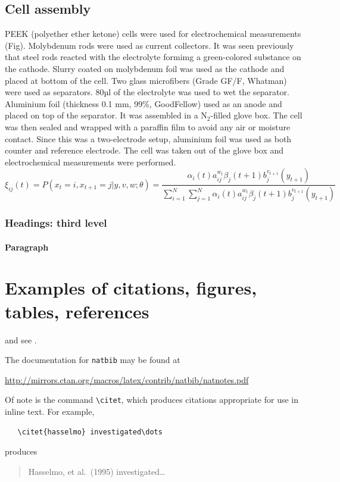 \documentclass{article}
\begin{document}
\subsection{Cell assembly}
PEEK (polyether ether ketone) cells were used for electrochemical measurements (Fig). Molybdenum rods were used as current collectors. It was seen previously that steel rods reacted with the electrolyte formimg a green-colored substance on the cathode. Slurry coated on molybdenum foil was used as the cathode and placed at bottom of the cell. Two glass microfibers (Grade GF/F, Whatman) were used as separators. 80µl of the electrolyte was used to wet the separator. Aluminium foil (thickness 0.1 mm, 99$\%$, GoodFellow) used as an anode and placed on top of the separator. It was assembled in a N$_2$-filled glove box. The cell was then sealed and wrapped with a paraffin film to avoid any air or moisture contact. Since this was a two-electrode setup, aluminium foil was used as both counter and reference electrode. The cell was taken out of the glove box and electrochemical measurements were performed. 
\lipsum[5]
\begin{equation}
\xi _{ij}(t)=P(x_{t}=i,x_{t+1}=j|y,v,w;\theta)= {\frac {\alpha _{i}(t)a^{w_t}_{ij}\beta _{j}(t+1)b^{v_{t+1}}_{j}(y_{t+1})}{\sum _{i=1}^{N} \sum _{j=1}^{N} \alpha _{i}(t)a^{w_t}_{ij}\beta _{j}(t+1)b^{v_{t+1}}_{j}(y_{t+1})}}
\end{equation}

\subsubsection{Headings: third level}
\lipsum[6]

\paragraph{Paragraph}
\lipsum[7]

\section{Examples of citations, figures, tables, references}
\label{sec:others}
\lipsum[8] \cite{kour2014real,kour2014fast} and see \cite{hadash2018estimate}.

The documentation for \verb+natbib+ may be found at
\begin{center}
  \url{http://mirrors.ctan.org/macros/latex/contrib/natbib/natnotes.pdf}
\end{center}
Of note is the command \verb+\citet+, which produces citations
appropriate for use in inline text.  For example,
\begin{verbatim}
   \citet{hasselmo} investigated\dots
\end{verbatim}
produces
\begin{quote}
  Hasselmo, et al.\ (1995) investigated\dots
\end{quote}
\end{document}
